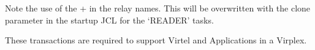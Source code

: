\documentclass[letterpaper,10pt,english]{sphinxmanual}
\begin{document}
\begin{sphinxVerbatim}[commandchars=\\\{\}]
                                            
                                                 
                             
                                                         
                                                     
                                                        
                                                       
\end{sphinxVerbatim}

Note the use of the + in the relay names. This will be overwritten with the clone parameter in the startup JCL for the ‘READER’ tasks.


These transactions are required to support Virtel and Applications in a Virplex.
\end{document}
